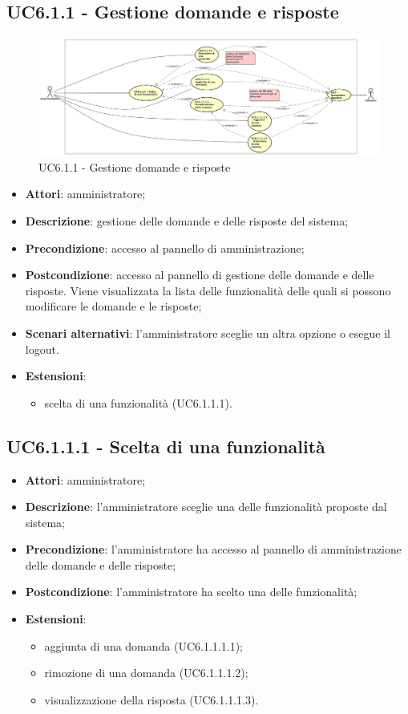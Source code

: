 \documentclass[../AnalisiDeiRequisiti.tex]{subfiles}
\begin{document}
\subsection{UC6.1.1 - Gestione domande e risposte}
\begin{figure}[!h]
	\centering
	\includegraphics[width=\textwidth]{UseCases/UC6-Amministrazione/Immagini/UCGestioneDomandeERisposte.png}
	\caption{UC6.1.1 - Gestione domande e risposte}
\end{figure}	
\label{sssec:UC6.1.1} 
\begin{itemize} 
\item \textbf{Attori}: amministratore;
\item \textbf{Descrizione}: gestione delle domande e delle risposte del sistema;
\item \textbf{Precondizione}: accesso al pannello di amministrazione;
\item \textbf{Postcondizione}: accesso al pannello di gestione delle domande e delle risposte. Viene visualizzata la lista delle funzionalità delle quali si possono modificare le domande e le risposte;
\item \textbf{Scenari alternativi}: l'amministratore sceglie un altra opzione o esegue il logout.
\item \textbf{Estensioni}:\begin{itemize}\item scelta di una funzionalità (UC6.1.1.1).\end{itemize}
\end{itemize} 
\subsection{UC6.1.1.1 - Scelta di una funzionalità} 
\label{sssec:UC6.1.1.1} 
\begin{itemize} 
\item \textbf{Attori}: amministratore;
\item \textbf{Descrizione}: l'amministratore sceglie una delle funzionalità proposte dal sistema;
\item \textbf{Precondizione}: l'amministratore ha accesso al pannello di amministrazione delle domande e delle risposte;
\item \textbf{Postcondizione}: l'amministratore ha scelto una delle funzionalità;
\item \textbf{Estensioni}:\begin{itemize}\item aggiunta di una domanda (UC6.1.1.1.1);\item rimozione di una domanda (UC6.1.1.1.2);\item visualizzazione della risposta (UC6.1.1.1.3).\end{itemize}
\end{itemize} 
\end{document}
